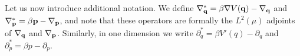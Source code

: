 \documentclass[11pt,a4paper]{article}
\begin{document}
Let us now introduce additional notation.
We define $\nabla_{\boldsymbol{\mathbf q}}^* = \beta \nabla V(\boldsymbol{\mathbf q}) - \nabla_{\boldsymbol{\mathbf q}}$ and $\nabla_{\boldsymbol{\mathbf p}}^* = \beta \boldsymbol{\mathbf p} - \nabla_{\boldsymbol{\mathbf p}}$,
and note that these operators are formally the $L^2(\mu)$ adjoints of $\nabla_{\boldsymbol{\mathbf q}}$ and $\nabla_{\boldsymbol{\mathbf p}}$.
Similarly, in one dimension we write $\partial_q^* = \beta V'(q) - \partial_q$ and $\partial_p^* = \beta p - \partial_p$.

%
\end{document}
